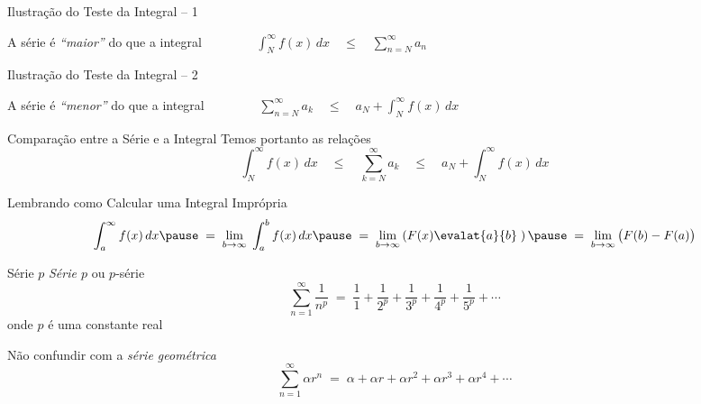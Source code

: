 \begin{frame}{Ilustração do Teste da Integral -- 1}
  \begin{center}
    \scalebox{.9}{}
  \end{center}

  \pause
  A série é \emph{``maior''} do que a integral
  \pause
  \(
    \qquad\qquad
    \int_{N}^{\infty} f(x)\,dx
    \quad\leq\quad
    \sum_{n=N}^{\infty} a_n
  \)
\end{frame}

\begin{frame}{Ilustração do Teste da Integral -- 2}
  \begin{center}
    \scalebox{.9}{}
  \end{center}

  \pause
  A série é \emph{``menor''} do que a integral
  \pause
  \(
    \qquad\qquad
    \sum_{n=N}^\infty a_k
    \quad\leq\quad
    a_{N} + \int_{N}^\infty f(x)\,dx
  \)
\end{frame}

\begin{frame}{Comparação entre a Série e a Integral}
  Temos portanto as relações
  \[
  \int_{N}^{\infty} f(x)\,dx
  \quad\leq\quad
  \sum_{k=N}^{\infty} a_k
  \quad\leq\quad
  a_N + \int_{N}^{\infty} f(x)\,dx
  \]
\end{frame}

\begin{frame}{Lembrando como Calcular uma Integral Imprópria}
  \[
    \int_{a}^{\infty} f(x)\,dx
    \pause \;=\;
    \lim_{b\to\infty} \; \int_{a}^{b} f(x)\,dx
    \pause \;=\;
    \lim_{b\to\infty} \left( F(x) \evalat{a}{b} \; \right)
    \pause \;=\;
    \lim_{b\to\infty} \big( F(b) - F(a) \big)
  \]
\end{frame}

\begin{frame}{Série $p$}
  \emph{Série $p$} ou $p$-série
  \[ \sum_{n=1}^{\infty} \frac{1}{n^p} \;=\;
     \frac{1}{1} +
     \frac{1}{2^p} +
     \frac{1}{3^p} +
     \frac{1}{4^p} +
     \frac{1}{5^p} + \cdots
  \]
  onde $p$ é uma constante real

  \pause
  \vspace{\baselineskip}
  Não confundir com a \emph{série geométrica}
  \[
    \sum_{n=1}^{\infty} \alpha r^n
    \;=\; \alpha + \alpha r + \alpha r^2 + \alpha r^3 + \alpha r^4 + \cdots
  \]

\end{frame}

